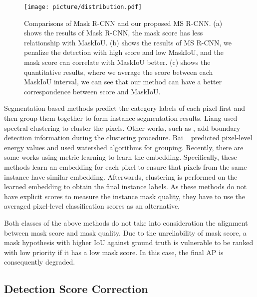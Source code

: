 \documentclass[10pt,twocolumn,letterpaper]{article}
\begin{document}
\begin{figure*}[!t]
\centering
\texttt{[image: picture/distribution.pdf]}
\caption{Comparisons of Mask R-CNN and our proposed MS R-CNN. (a) shows the results of Mask R-CNN, the mask score has less relationship with MaskIoU. (b) shows the results of MS R-CNN, we penalize the detection with high score and low MaskIoU, and the mask score can correlate with MaskIoU better. (c) shows the quantitative results, where we average the score between each MaskIoU interval, we can see that our method can have a better correspondence between score and MaskIoU.}
\label{fig:comv4}
\end{figure*}         
    
    Segmentation based methods predict the category labels of each pixel first and then group them together to form instance segmentation results. Liang \etal \cite{liang2015proposal} used spectral clustering to cluster the pixels. Other works, such as \cite{jin2016object, kirillov2017instancecut}, add boundary detection information during the clustering procedure. 
    Bai \etal~\cite{bai2017deepwatershed} predicted pixel-level energy values and used watershed algorithms for grouping. 
    Recently, there are some works \cite{newell2017associative, fathi2017semantic, harley2017segmentation, de2017semantic} using metric learning to learn the embedding. Specifically, these methods learn an embedding for each pixel to ensure that pixels from the same instance have similar embedding. Afterwards, clustering is performed on the learned embedding to obtain the final instance labels. 
    As these methods do not have explicit scores to measure the instance mask quality, they have to use the averaged pixel-level classification scores as an alternative.
    
    Both classes of the above methods do not take into consideration the alignment between mask score and mask quality. Due to the unreliability of mask score, a mask hypothesis with higher IoU against ground truth is vulnerable to be ranked with low priority if it has a low mask score. In this case, the final AP is consequently degraded.
    

    
\subsection{Detection Score Correction}    
\end{document}

